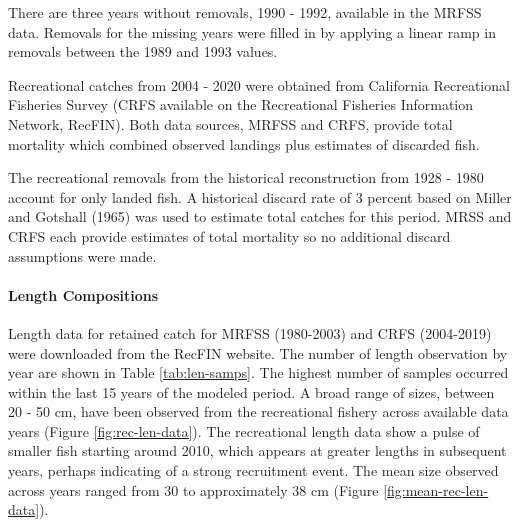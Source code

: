 \documentclass[11pt,
  english,
  a4paper,
]{article}
\begin{document}
\leavevmode\tagmcend\tagstructend\par


There are three years without removals, 1990 - 1992, available in the MRFSS data. Removals for the missing years were filled in by applying a linear ramp in removals between the 1989 and 1993 values.

\leavevmode\tagmcend\tagstructend\par


Recreational catches from 2004 - 2020 were obtained from California Recreational Fisheries Survey (CRFS available on the Recreational Fisheries Information Network, RecFIN). Both data sources, MRFSS and CRFS, provide total mortality which combined observed landings plus estimates of discarded fish.

\leavevmode\tagmcend\tagstructend\par


The recreational removals from the historical reconstruction from 1928 - 1980 account for only landed fish. A historical discard rate of 3 percent based on Miller and Gotshall {(1965)\leavevmode\tagmcend\tagstructend} was used to estimate total catches for this period. MRSS and CRFS each provide estimates of total mortality so no additional discard assumptions were made.

\leavevmode\tagmcend\tagstructend\par


\hypertarget{length-compositions-1}{%
\paragraph{Length Compositions}\label{length-compositions-1}}

\leavevmode\tagmcend\tagstructend


Length data for retained catch for MRFSS (1980-2003) and CRFS (2004-2019) were downloaded from the RecFIN website. The number of length observation by year are shown in Table \ref{tab:len-samps}. The highest number of samples occurred within the last 15 years of the modeled period. A broad range of sizes, between 20 - 50 cm, have been observed from the recreational fishery across available data years (Figure \ref{fig:rec-len-data}). The recreational length data show a pulse of smaller fish starting around 2010, which appears at greater lengths in subsequent years, perhaps indicating of a strong recruitment event. The mean size observed across years ranged from 30 to approximately 38 cm (Figure \ref{fig:mean-rec-len-data}).
\end{document}
